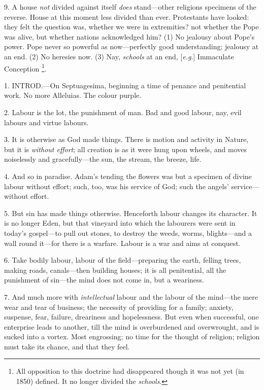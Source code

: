 9. A house \emph{not} divided against itself \emph{does}
stand—other religions specimens of the reverse. House at this moment
less divided than ever. Protestants have looked: they felt the
question was, whether we were in extremities? not whether the Pope was
alive, but whether nations acknowledged him? (1) No jealousy about
Pope's power. Pope never so powerful as now—perfectly good
understanding; jealousy at an end. (2) No heresies now. (3) Nay, \emph{schools}
at an end, [\emph{e.g}.] Immaculate Conception \footnote{All opposition to this doctrine had
disappeared though it was not yet (in 1850) defined. It no longer
divided the \emph{schools}.}.


1. INTROD.—On
Septuagesima, beginning a time of penance and penitential work. No
more Alleluias. The colour purple.

2. Labour is the lot, the punishment of man. Bad
and good labour, nay, evil labours and virtue labours.

3. It is otherwise as God made things. There is
motion and activity in Nature, but it is \emph{without effort}; all
creation is as it were hung upon wheels, and moves noiselessly and
gracefully—the sun, the stream, the breeze, life.

4. And so in paradise. Adam's tending the flowers
was but a specimen of divine labour without effort; such, too, was his
service of God; such the angels' service—without effort.

5. But sin has made things otherwise. Henceforth
labour changes its character. It is no longer Eden, but that vineyard
into which the labourers were sent in today's gospel—to pull out
stones, to destroy the weeds, worms, blights—and a wall round
it—for there is a warfare. Labour is a war and aims at conquest.

6. Take bodily labour, labour of the
field—preparing the earth, felling trees, making roads,
canals—then building houses; it is all penitential, all the
punishment of sin—the mind does not come in, but a weariness.

7. And much more with \emph{intellectual} labour
and the labour of the mind—the mere wear and tear of business;
the necessity of providing for a family; anxiety, suspense, fear,
failure, dreariness and hopelessness. But even when successful, one
enterprise leads to another, till the mind is overburdened and
overwrought, and is sucked into a vortex. Most engrossing; no time for
the thought of religion; religion must take its chance, and that they
feel.

